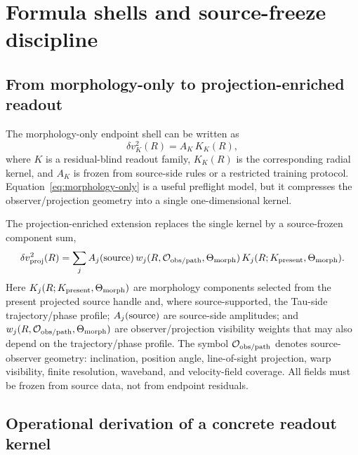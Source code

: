 \documentclass[11pt]{article}
\begin{document}
\section{Formula shells and source-freeze discipline}
\label{sec:formula-shells}

\subsection{From morphology-only to projection-enriched readout}

The morphology-only endpoint shell can be written as
\begin{equation}
  \delta v_K^2(R) = A_K\,K_K(R),
  \label{eq:morphology-only}
\end{equation}
where \(K\) is a residual-blind readout family, \(K_K(R)\) is the corresponding
radial kernel, and \(A_K\) is frozen from source-side rules or a restricted
training protocol.  Equation~\eqref{eq:morphology-only} is a useful preflight
model, but it compresses the observer/projection geometry into a single
one-dimensional kernel.

The projection-enriched extension replaces the single kernel by a source-frozen
component sum,
\begin{equation}
  \delta v_{\rm proj}^2(R)
  =
  \sum_j
  A_j({\rm source})\,
  w_j(R,{\cal O}_{\rm obs/path},\Theta_{\rm morph})\,
  K_j(R;K_{\rm present},\Theta_{\rm morph}) .
  \label{eq:projection-enriched}
\end{equation}
Here \(K_j(R;K_{\rm present},\Theta_{\rm morph})\) are morphology components
selected from the present projected source handle and, where source-supported,
the Tau-side trajectory/phase profile; \(A_j({\rm source})\) are source-side
amplitudes; and \(w_j(R,{\cal O}_{\rm obs/path},\Theta_{\rm morph})\) are
observer/projection visibility weights that may also depend on the
trajectory/phase profile.  The symbol \({\cal O}_{\rm obs/path}\) denotes
source-observer geometry: inclination, position angle, line-of-sight
projection, warp visibility, finite resolution, waveband, and velocity-field
coverage.  All fields must be frozen from source data, not from endpoint
residuals.

\subsection{Operational derivation of a concrete readout kernel}
\label{subsec:kernel-derivation-recipe}
\end{document}
